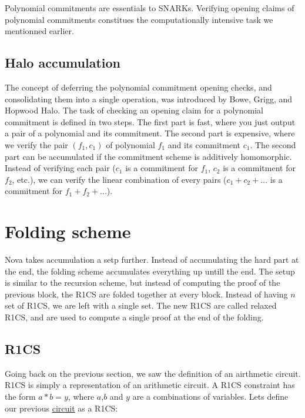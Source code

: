 Polynomial commitments are essentials to SNARKs. Verifying opening claims of polynomial commitments constitues the computationally intensive task we mentionned earlier. \cite{VR23}


\subsection{Halo accumulation}

The concept of deferring the polynomial commitment opening checks, and consolidating them into a single operation, was introduced by Bowe, Grigg, and Hopwood Halo.\cite{BGH23}
The task of checking an opening claim for a polynomial commitment is defined in two steps.
The first part is fast, where you just output a pair of a polynomial and its commitment. The second part is expensive, where we verify the pair $(f_1, c_1)$ of polynomial $f_1$ and its commitment $c_1$.
The second part can be accumulated if the commitment scheme is additively homomorphic. 
Instead of verifying each pair ($c_1$ is a commitment for $f_1$, $c_2$ is a commitment for $f_2$, etc.), we can verify the linear combination of every pairs ($c_1+c_2+...$ is a commitment for $f_1+f_2+...$). \cite{VR23}


\section{Folding scheme} 
Nova takes accumulation a setp further. Instead of accumulating the hard part at the end, the folding scheme accumulates everything up untill the end.
The setup is similar to the recursion scheme, but instead of computing the proof of the previous block, the R1CS are folded together at every block.
Instead of having $n$ set of R1CS, we are left with a single set. The new R1CS are called relaxed R1CS, and are used to compute a single proof at the end of the folding.
\cite{Nova23}  \cite{ASI23} 


\subsection{R1CS} 
Going back on the previous section, we saw the definition of an airthmetic circuit. 
R1CS is simply a representation of an arithmetic circuit.
A R1CS constraint has the form $a*b=y$, where $a$,$b$ and $y$ are a combinations of variables.
Lets define our previous \hyperref[subsec:ac]{circuit} as a R1CS:    

